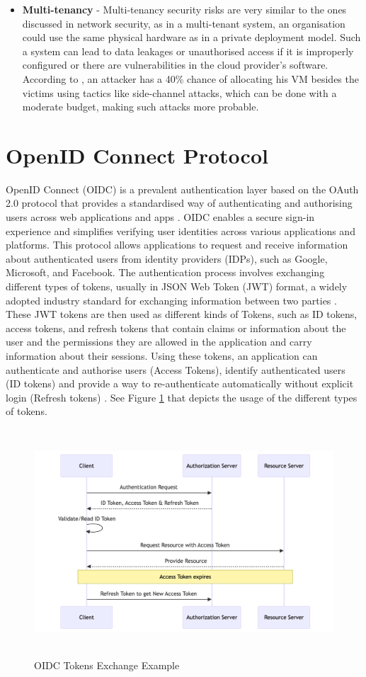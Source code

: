 \begin{itemize}
    \item \textbf{Multi-tenancy} - Multi-tenancy security risks are very similar to the ones discussed in network security, as in a multi-tenant system, an organisation could use the same physical hardware as in a private deployment model. Such a system can lead to data leakages or unauthorised access if it is improperly configured or there are vulnerabilities in the cloud provider's software.   According to \citep{multi_tenancy_cloud_risk}, an attacker has a 40\% chance of allocating his VM besides the victims using tactics like side-channel attacks, which can be done with a moderate budget, making such attacks more probable.

\end{itemize}

\section{OpenID Connect Protocol}
OpenID Connect (OIDC) is a prevalent authentication layer based on the OAuth 2.0 protocol that provides a standardised way of authenticating and authorising users across web applications and apps \citep{oidc_intro}. OIDC enables a secure sign-in experience and simplifies verifying user identities across various applications and platforms. This protocol allows applications to request and receive information about authenticated users from identity providers (IDPs), such as Google, Microsoft, and Facebook. The authentication process involves exchanging different types of tokens, usually in JSON Web Token (JWT) format, a widely adopted industry standard for exchanging information between two parties \citep{jwt}. These JWT tokens are then used as different kinds of Tokens, such as ID tokens, access tokens, and refresh tokens that contain claims or information about the user and the permissions they are allowed in the application and carry information about their sessions. Using these tokens, an application can authenticate and authorise users (Access Tokens), identify authenticated users (ID tokens) and provide a way to re-authenticate automatically without explicit login (Refresh tokens) \citep{oidc_tokens}. See Figure \ref{fig:oidc_simple} that depicts the usage of the different types of tokens.
\begin{figure}[h!]
\centering
\includegraphics[width=\textwidth, height=320px]{pics/oidc_simple.png}
\caption{OIDC Tokens Exchange Example}\label{fig:oidc_simple}
\end{figure}



